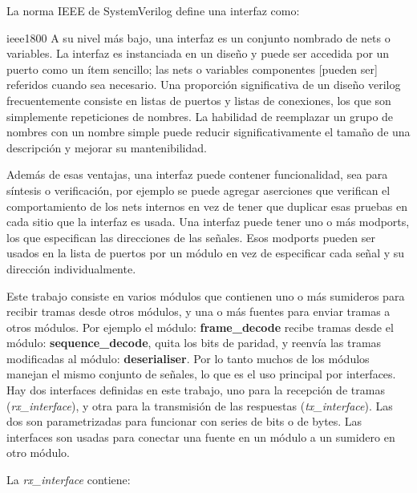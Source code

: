 \documentclass[a4paper, twoside, 11pt]{report}
\begin{document}
La norma IEEE de SystemVerilog define una interfaz como:

\begin{displaycquote}[traducido de][]{ieee1800}
A su nivel más bajo, una interfaz es un conjunto nombrado de nets o variables. La interfaz es instanciada en un diseño y puede ser accedida por un puerto como un ítem sencillo; las nets o variables componentes [pueden ser] referidos cuando sea necesario. Una proporción significativa de un diseño verilog frecuentemente consiste en listas de puertos y listas de conexiones, los que son simplemente repeticiones de nombres. La habilidad de reemplazar un grupo de nombres con un nombre simple puede reducir significativamente el tamaño de una descripción y mejorar su mantenibilidad.
\end{displaycquote}

Además de esas ventajas, una interfaz puede contener funcionalidad, sea para síntesis o verificación, por ejemplo se puede agregar aserciones que verifican el comportamiento de los nets internos en vez de tener que duplicar esas pruebas en cada sitio que la interfaz es usada. Una interfaz puede tener uno o más modports, los que especifican las direcciones de las señales. Esos modports pueden ser usados en la lista de puertos por un módulo en vez de especificar cada señal y su dirección individualmente.

Este trabajo consiste en varios módulos que contienen uno o más sumideros para recibir tramas desde otros módulos, y una o más fuentes para enviar tramas a otros módulos. Por ejemplo el módulo: \textbf{frame\_decode} recibe tramas desde el módulo: \textbf{sequence\_decode}, quita los bits de paridad, y reenvía las tramas modificadas al módulo: \textbf{deserialiser}. Por lo tanto muchos de los módulos manejan el mismo conjunto de señales, lo que es el uso principal por interfaces. Hay dos interfaces definidas en este trabajo, uno para la recepción de tramas (\textit{rx\_interface}), y otra para la transmisión de las respuestas (\textit{tx\_interface}). Las dos son parametrizadas para funcionar con series de bits o de bytes. Las interfaces son usadas para conectar una fuente en un módulo a un sumidero en otro módulo.

La \textit{rx\_interface} contiene:
\end{document}
